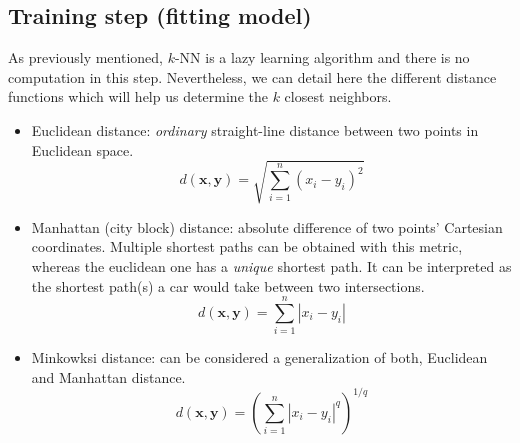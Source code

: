 \subsection{Training step (fitting model)}
As previously mentioned, $k$-NN is a lazy learning algorithm and there is no computation in this step. Nevertheless, we can detail here the different distance functions which will help us determine the $k$ closest neighbors.
\begin{itemize}
	\item Euclidean distance: \textit{ordinary} straight-line distance between two points in Euclidean space. 
	\begin{equation}
	d(\boldsymbol{x}, \boldsymbol{y}) = 
	\sqrt{\sum_{i = 1}^{n} (x_i - y_i)^{2}}
	\end{equation}
	\item Manhattan (city block) distance: absolute difference of two points' Cartesian coordinates. Multiple shortest paths can be obtained with this metric, whereas the euclidean one has a \textit{unique} shortest path. It can be interpreted as the shortest path(s) a car would take between two intersections.
	\begin{equation}
	d(\boldsymbol{x}, \boldsymbol{y}) = 
	\sum_{i = 1}^{n} |x_i - y_i|
	\end{equation}
	\item Minkowksi distance: can be considered a generalization of both, Euclidean and Manhattan distance.  
	\begin{equation}
	d(\boldsymbol{x}, \boldsymbol{y}) = \left( 
	\sum_{i = 1}^{n} |x_i - y_i|^{q} \right)^{1/q}
	\end{equation}
\end{itemize}

